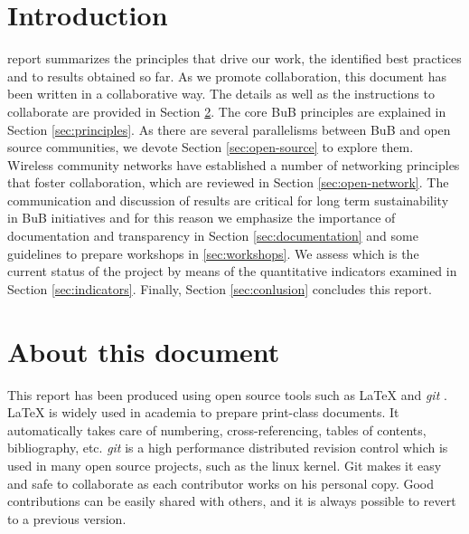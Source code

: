 \documentclass[draftclsnofoot,12pt,journal,onecolumn]{IEEEtran}
\begin{document}
\section{Introduction}
% 
% 
% 
% 
 report summarizes the principles that drive our work, the identified best practices and to results obtained so far.
As we promote collaboration, this document has been written in a collaborative way. 
The details as well as the instructions to collaborate are provided in Section \ref{sec:about}.
The core BuB principles are explained in Section \ref{sec:principles}.
As there are several parallelisms between BuB and open source communities, we devote Section \ref{sec:open-source} to explore them.
Wireless community networks have established a number of networking principles that foster collaboration, which are reviewed in Section \ref{sec:open-network}.
The communication and discussion of results are critical for long term sustainability in BuB initiatives and for this reason we emphasize the importance of documentation and transparency in Section \ref{sec:documentation} and some guidelines to prepare workshops in \ref{sec:workshops}.
We assess which is the current status of the project by means of the quantitative indicators examined in Section \ref{sec:indicators}.
Finally, Section \ref{sec:conlusion} concludes this report.

\section{About this document}
\label{sec:about}

This report has been produced using open source tools such as {\LaTeX} \cite{lamport1994ldp} and \emph{git} \cite{chacon2009pg}.
{\LaTeX} is widely used in academia to prepare print-class documents.
It automatically takes care of numbering, cross-referencing, tables of contents, bibliography, etc.
\emph{git} is a high performance distributed revision control which is used in many open source projects, such as the linux kernel.
Git makes it easy and safe to collaborate as each contributor works on his personal copy.
Good contributions can be easily shared with others, and it is always possible to revert to a previous version.
\end{document}

